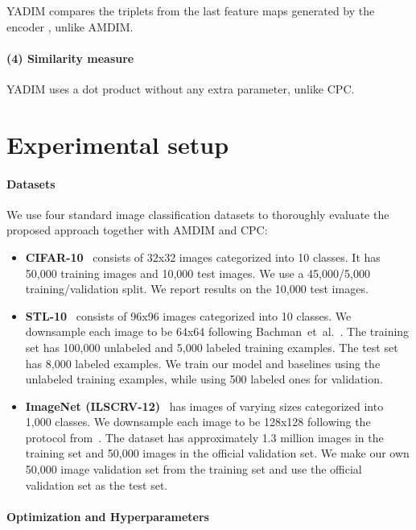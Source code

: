 \documentclass{article}
\begin{document}
YADIM compares the triplets from the last feature maps generated by the encoder , unlike AMDIM.

\paragraph{(4) Similarity measure}

YADIM uses a dot product  without any extra parameter, unlike CPC.

\section{Experimental setup}

\paragraph{Datasets}

We use four standard image classification datasets to thoroughly evaluate the proposed approach together with AMDIM and CPC:
\begin{itemize}
    \item  \textbf{CIFAR-10}~\cite{krizhevsky2009learning} consists of 32x32 images categorized into 10 classes. It has 50,000 training images and 10,000 test images. We use a 45,000/5,000 training/validation split. We report results on the 10,000 test images.
    
    \item \textbf{STL-10}~\cite{coates2011analysis} consists of 96x96 images categorized into 10 classes. We downsample each image to be 64x64 following Bachman~et~al.~\cite{bachman2019learning}. 
The training set has 100,000 unlabeled and 5,000 labeled training examples. The test set has 8,000 labeled examples. We train our model and baselines using the unlabeled training examples, while using 500 labeled ones for validation.
    
    \item \textbf{ImageNet (ILSCRV-12)}~\cite{deng2009ImageNet} has images of varying sizes categorized into 1,000 classes. We downsample each image to be 128x128 following the protocol from~\cite{bachman2019learning}. The dataset has approximately 1.3 million images in the training set and 50,000 images in the official validation set. We make our own 50,000 image validation set from the training set and use the official validation set as the test set.
\end{itemize}

\paragraph{Optimization and Hyperparameters} 
\end{document}

